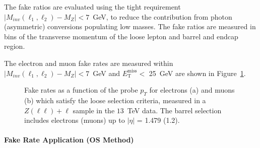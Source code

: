 The fake ratios are evaluated using the tight requirement 
$|M_{inv}(\ell_{1},\ell_{2}) - M_{Z}| < 7 $~GeV, to reduce the 
contribution from photon (asymmetric) conversions populating low masses. 
The fake ratios are measured in bins of the transverse momentum of the loose lepton and barrel and endcap region.

The electron and muon fake rates are measured within 
$|M_{inv}(\ell_{1},\ell_{2}) - M_{Z}| < 7 $~GeV and $E_{\mathrm{T}}^\text{miss}  < $ 25~GeV are 
shown in Figure~\ref{fig:os_fakerates}. 

\begin{figure}[!htb]
\begin{center}
  \caption{
Fake rates as a function of the probe $p_T$ for  electrons (a) and muons (b) which satisfy the loose selection criteria, measured in
a $Z(\ell\ell)+\ell$ sample in the $13$~TeV data.
The barrel selection includes electrons (muons) up to $|\eta|$ = 1.479 (1.2).
}
\label{fig:os_fakerates}
\end{center}
\end{figure}



\paragraph{Fake Rate Application (OS Method)}
\label{sec:zxA}

